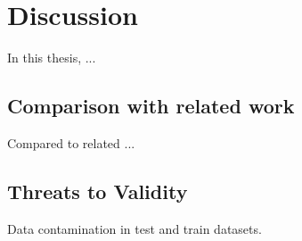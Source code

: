 \chapter{Discussion}
\label{chap:discussion}

In this thesis, ...

\section{Comparison with related work}
Compared to related ...

\section{Threats to Validity}

Data contamination in test and train datasets.